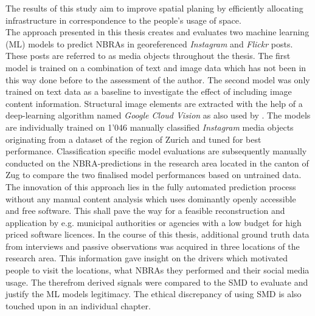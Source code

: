 The results of this study aim to improve spatial planing by efficiently allocating infrastructure in correspondence to the people's usage of space.\\
\newline
The approach presented in this thesis creates and evaluates two machine learning (ML) models to predict NBRAs in georeferenced \textit{Instagram} and \textit{Flickr} posts. These posts are referred to as media objects throughout the thesis. The first model is trained on a combination of text and image data which has not been in this way done before to the assessment of the author. The second model was only trained on text data as a baseline to investigate the effect of including image content information. Structural image elements are extracted with the help of a deep-learning algorithm named \textit{Google Cloud Vision} as also used by \parencite{Richards2018}. The models are individually trained on 1'046 manually classified \textit{Instagram} media objects originating from a dataset of the region of Zurich \parencite{XY} and tuned for best performance. Classification specific model evaluations are subsequently manually conducted on the NBRA-predictions in the research area located in the canton of Zug to compare the two finalised model performances based on untrained data. The innovation of this approach lies in the fully automated prediction process without any manual content analysis which uses dominantly openly accessible and free software. This shall pave the way for a feasible reconstruction and application by e.g. municipal authorities or agencies with a low budget for high priced software licences.
\newline
In the course of this thesis, additional ground truth data from interviews and passive observations was acquired in three locations of the research area. This information gave insight on the drivers which motivated people to visit the locations, what NBRAs they performed and their social media usage. The therefrom derived signals were compared to the SMD \parencite{Wartmann2018} to evaluate and justify the ML models legitimacy. The ethical discrepancy of using SMD is also touched upon in an individual chapter.
